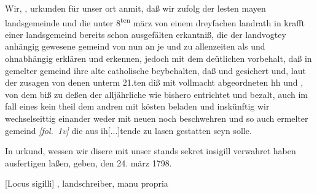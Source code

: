 \documentclass[10pt,twoside]{article}
\begin{document}
\begin{source}

               
                  
                     Wir, , urkunden für unser ort anmit, daß
                     wir zufolg der lesten mayen landsgemeinde\leavevmode{} und die
                     unter 8\textsuperscript{ten} märz
                     von einem drey\leavevmode{}fachen landrath in krafft einer landsgemeind bereits schon ausgefälten
                     erkantniß, die\leavevmode{}
                     der landvogtey \leavevmode{} anhängig gewesene gemeind \leavevmode{} von nun an je und zu allenzeiten als 
                     und ohnabhängig erklären und\leavevmode{} erkennen, jedoch mit
                     dem deütlichen vorbehalt, daß in gemelter gemeind ihre alte catholische
                     beybehalten, daß  und  gesichert und, laut\leavevmode{} der zusagen von denen unterm 21.ten diß mit vollmacht abgeordneten hh 
                      und , von dem  biß zu deßen
                     der alljährliche
                      wie bishero entrichtet und bezalt, auch im
                     fall eines  kein theil dem andren mit kösten
                     beladen und inskünftig wir wechselseittig einander\leavevmode{}  weder mit neuen
                      noch 
                     beschwehren und so auch ermelter gemeind \noindent \pb{} \textit{[fol.~1v]}
                     die aus ih[...]tende\leavevmode{}
                     zu lasen gestatten seyn solle.


                        In urkund, wessen wir disere  mit unser
                        stands sekret insigill verwahret haben ausfertigen laßen, geben, den
                        24. märz 1798.


                           [Locus sigilli]
                           , landschreiber, manu propria


               
               
            
\end{source}








\printnotes*
\end{document}
